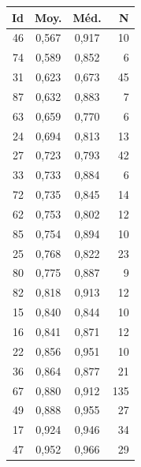 \documentclass[12pt,a4paper]{report}
\begin{document}
\bigskip
\noindent
\begin{minipage}[t]{0.48\textwidth}
\centering
\begin{tabular}{rccr}
\toprule
\textbf{Id} & \textbf{Moy.} & \textbf{Méd.} & \textbf{N} \\
\midrule
46 & 0,567 & 0,917 & 10 \\
74 & 0,589 & 0,852 & 6 \\
31 & 0,623 & 0,673 & 45 \\
87 & 0,632 & 0,883 & 7 \\
63 & 0,659 & 0,770 & 6 \\
24 & 0,694 & 0,813 & 13 \\
27 & 0,723 & 0,793 & 42 \\
33 & 0,733 & 0,884 & 6 \\
72 & 0,735 & 0,845 & 14 \\
62 & 0,753 & 0,802 & 12 \\
85 & 0,754 & 0,894 & 10 \\
25 & 0,768 & 0,822 & 23 \\
80 & 0,775 & 0,887 & 9 \\
82 & 0,818 & 0,913 & 12 \\
15 & 0,840 & 0,844 & 10 \\
16 & 0,841 & 0,871 & 12 \\
22 & 0,856 & 0,951 & 10 \\
36 & 0,864 & 0,877 & 21 \\
67 & 0,880 & 0,912 & 135 \\
49 & 0,888 & 0,955 & 27 \\
17 & 0,924 & 0,946 & 34 \\
47 & 0,952 & 0,966 & 29 \\
\bottomrule
\end{tabular}
\end{minipage}\hfill
\end{document}
